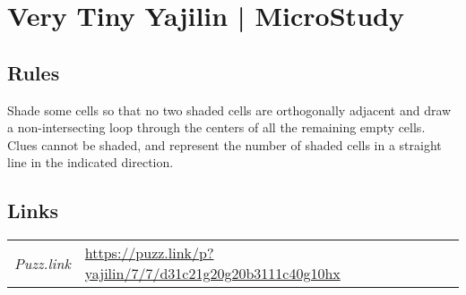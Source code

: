 \section{Very Tiny Yajilin | {\normalfont MicroStudy}}
\label{sec:53-very-tiny-yajilin-microstudy}

\subsection*{Rules}
\begin{markdown}
Shade some cells so that no two shaded cells are orthogonally adjacent and draw a non-intersecting loop through the centers of all the remaining empty cells. Clues cannot be shaded, and represent the number of shaded cells in a straight line in the indicated direction.
\end{markdown}
\subsection*{Links}
\begin{tabularx}{\textwidth}{l X}
\emph{Puzz.link} & \url{https://puzz.link/p?yajilin/7/7/d31c21g20g20b3111c40g10hx} \\
\end{tabularx}
\pagebreak
